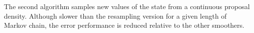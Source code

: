\documentclass[journal]{IEEEtran}
\begin{document}
The second algorithm samples new values of the state from a continuous proposal density. Although slower than the resampling version for a given length of Markov chain, the error performance is reduced relative to the other smoothers.





%
%



%
%
\end{document}
